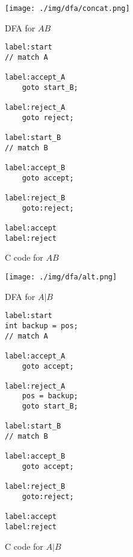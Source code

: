 \documentclass[11pt,a4paper]{report}
\newcommand{\regexp}[1]{$#1$}
\begin{document}
\begin{figure}[h!]
	\begin{subfigure}[h]{0.45\textwidth}
		\centering
		\texttt{[image: ./img/dfa/concat.png]}
		\caption{DFA for \regexp{AB}}
	\end{subfigure}
	\hspace{0.05\textwidth}
	\begin{subfigure}[h]{0.45\textwidth}
		\centering
		\begin{lstlisting}[style=C]
label:start
// match A

label:accept_A
	goto start_B;

label:reject_A
	goto reject;

label:start_B
// match B

label:accept_B
	goto accept;

label:reject_B
	goto:reject;

label:accept
label:reject
		\end{lstlisting}
		\caption{C code for \regexp{AB}}
	\end{subfigure}
	\caption{}
\end{figure}

\begin{figure}[h!]
	\begin{subfigure}[h]{0.45\textwidth}
		\centering
		\texttt{[image: ./img/dfa/alt.png]}
		\caption{DFA for \regexp{A|B}}
	\end{subfigure}
	\hspace{0.05\textwidth}
	\begin{subfigure}[h]{0.45\textwidth}
		\centering
		\begin{lstlisting}[style=C]
label:start
int backup = pos;
// match A

label:accept_A
	goto accept;

label:reject_A
	pos = backup;
	goto start_B;

label:start_B
// match B

label:accept_B
	goto accept;

label:reject_B
	goto:reject;

label:accept
label:reject
		\end{lstlisting}
		\caption{C code for \regexp{A|B}}
	\end{subfigure}
	\caption{}
	\label{dfatoc-alt}
\end{figure}
\end{document}
